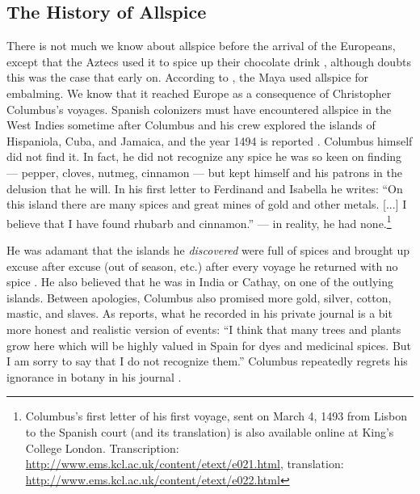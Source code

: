 

\subsection{The History of Allspice}


There is not much we know about allspice before the arrival of the Europeans, except that the Aztecs used it to spice up their chocolate drink \autocites[27]{farrell_spices_1985}, although \textcite[145, 177]{dalby_dangerous_2000} doubts this was the case that early on. According to \textcite[21]{duke_crc_2002}, the Maya used allspice for embalming. We know that it reached Europe as a consequence of Christopher Columbus's voyages. Spanish colonizers must have encountered allspice in the West Indies sometime after Columbus and his crew explored the islands of Hispaniola, Cuba, and Jamaica, and the year 1494 is reported \autocite[12]{opara_culinary_2021}. Columbus himself did not find it. In fact, he did not recognize any spice he was so keen on finding --- pepper, cloves, nutmeg, cinnamon --- but kept himself and his patrons in the delusion that he will. In his first letter to Ferdinand and Isabella he writes: ``On this island there are many spices and great mines of gold and other metals. [...] I believe that I have found rhubarb and cinnamon.'' \autocite[10-18]{columbus_spanish_1893}  --- in reality, he had none.\footnote{Columbus's first letter of his first voyage, sent on March 4, 1493 from Lisbon to the Spanish court (and its translation) is also available online at King's College London. Transcription: \url{http://www.ems.kcl.ac.uk/content/etext/e021.html}, translation: \url{http://www.ems.kcl.ac.uk/content/etext/e022.html}}

He was adamant that the islands he \textit{discovered} were full of spices and brought up excuse after excuse (out of season, etc.) after every voyage he returned with no spice \autocite[149]{dalby_dangerous_2000}. He also believed that he was in India or Cathay, on one of the outlying islands. Between apologies, Columbus also promised more gold, silver, cotton, mastic, and slaves. As \textcite[150]{dalby_dangerous_2000} reports, what he recorded in his private journal is a bit more honest and realistic version of events: ``I think that many trees and plants grow here which will be highly valued in Spain for dyes and medicinal spices. But I am sorry to say that I do not recognize them.'' Columbus repeatedly regrets his ignorance in botany in his journal \autocite[see also][57]{columbus_journal_2010}.

